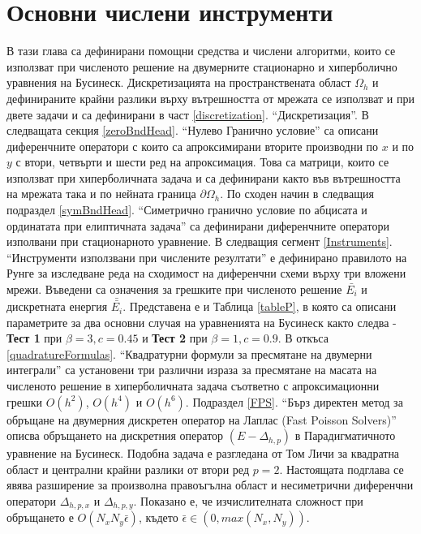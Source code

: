 \documentclass{article}
\theoremstyle{remark}
\begin{document}
\section{Основни числени инструменти}\label{numaBasic}
В тази глава са дефинирани помощни средства и числени алгоритми, които се използват при численото решение на двумерните стационарно и хиперболично уравнения на Бусинеск. Дискретизацията на пространствената област $\Omega_h$ и дефинираните крайни разлики върху вътрешността от мрежата се използват и при двете задачи и са дефинирани в част \ref{discretization}. ``Дискретизация''. В следващата секция \ref{zeroBndHead}. ``Нулево Гранично условие'' са описани диференчните оператори с които са апроксимирани вторите производни по $x$ и по $y$ с втори, четвърти и шести ред на апроксимация. Това са матрици, които се използват при хиперболичната задача и са дефинирани както във вътрешността на мрежата така и по нейната граница $\partial \Omega_h$. По сходен начин в следващия подраздел \ref{symBndHead}. ``Симетрично гранично условие по абцисата и ординатата при елиптичната задача'' са дефинирани диференчните оператори изполвани при стационарното уравнение. В следващия сегмент \ref{Instruments}. ``Инструменти използвани при числените резултати'' е дефинирано правилото на Рунге за изследване реда на сходимост на диференчни схеми върху три вложени мрежи. Въведени са означения за грешките при численото решение $\bar{ E_i}$ и дискретната енергия $\bar{\bar{ E_i}}$. Представена е и Таблица \ref{tableP}, в която са описани параметрите за два основни случая на уравненията на Бусинеск както следва - \textbf{Тест 1} при $\beta = 3, c=0.45$ и \textbf{Тест 2} при $\beta = 1, c=0.9$. В откъса \ref{quadratureFormulas}. ``Квадратурни формули за пресмятане на двумерни интеграли'' са установени три различни израза за пресмятане на масата на численото решение в хиперболичната задача съответно с апроксимационни грешки $O(h^2)$, $O(h^4)$ и $O(h^6)$.  Подраздел \ref{FPS}. ``Бърз директен метод за обръщане на двумерния дискретен оператор на Лаплас (Fast Poisson Solvers)'' описва обръщането на дискретния оператор $(E-\Delta_{h,p})$ в Парадигматичното уравнение на Бусинеск. Подобна задача е разгледана от Том Личи за квадратна област и централни крайни разлики от втори ред $p=2$. Настоящата подглава се явява разширение за произволна правоъгълна област и несиметрични диференчни оператори $\Delta_{h,p,x}$ и $\Delta_{h,p,y}$. Показано е, че изчислителната сложност при обръщането е $O(N_x N_y \bar{\epsilon})$, където $\bar{\epsilon} \in (0, max(N_x, N_y))$.
\end{document}
